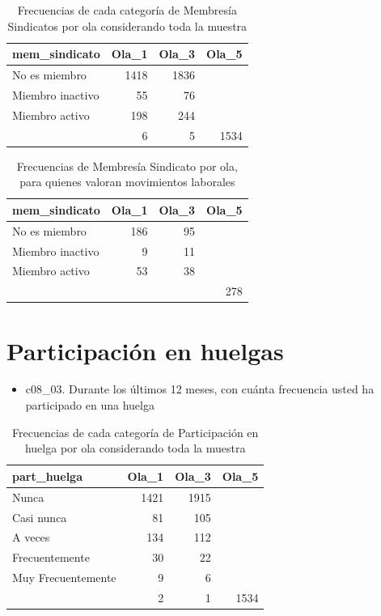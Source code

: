 \documentclass[
  12pt,
]{book}
\providecommand{\tightlist}{%
  \setlength{\itemsep}{0pt}\setlength{\parskip}{0pt}}
\begin{document}
\begin{table}

\caption{\label{tab:unnamed-chunk-22}Frecuencias de cada categoría de Membresía Sindicatos por ola considerando toda la muestra}
\centering
\begin{tabular}[t]{l|r|r|r}
\hline
mem\_sindicato & Ola\_1 & Ola\_3 & Ola\_5\\
\hline
No es miembro & 1418 & 1836 & \\
\hline
Miembro inactivo & 55 & 76 & \\
\hline
Miembro activo & 198 & 244 & \\
\hline
 & 6 & 5 & 1534\\
\hline
\end{tabular}
\end{table}

\begin{table}

\caption{\label{tab:unnamed-chunk-23}Frecuencias de Membresía Sindicato por ola, para quienes valoran movimientos laborales}
\centering
\begin{tabular}[t]{l|r|r|r}
\hline
mem\_sindicato & Ola\_1 & Ola\_3 & Ola\_5\\
\hline
No es miembro & 186 & 95 & \\
\hline
Miembro inactivo & 9 & 11 & \\
\hline
Miembro activo & 53 & 38 & \\
\hline
 &  &  & 278\\
\hline
\end{tabular}
\end{table}

\hypertarget{participaciuxf3n-en-huelgas}{%
\section{Participación en huelgas}\label{participaciuxf3n-en-huelgas}}

\begin{itemize}
\tightlist
\item
  c08\_03. Durante los últimos 12 meses, con cuánta frecuencia usted ha participado en una huelga
\end{itemize}

\begin{table}

\caption{\label{tab:unnamed-chunk-24}Frecuencias de cada categoría de Participación en huelga por ola considerando toda la muestra}
\centering
\begin{tabular}[t]{l|r|r|r}
\hline
part\_huelga & Ola\_1 & Ola\_3 & Ola\_5\\
\hline
Nunca & 1421 & 1915 & \\
\hline
Casi nunca & 81 & 105 & \\
\hline
A veces & 134 & 112 & \\
\hline
Frecuentemente & 30 & 22 & \\
\hline
Muy Frecuentemente & 9 & 6 & \\
\hline
 & 2 & 1 & 1534\\
\hline
\end{tabular}
\end{table}
\end{document}
